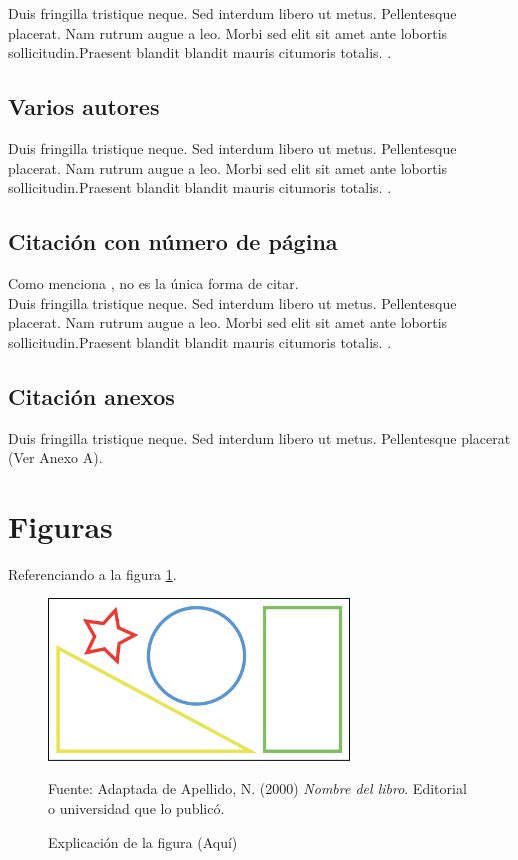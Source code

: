 Duis fringilla tristique neque. Sed interdum libero ut metus.
Pellentesque placerat. Nam rutrum augue a leo. Morbi sed 
elit sit amet ante lobortis sollicitudin.Praesent blandit 
blandit mauris citumoris totalis. \cite{libro:ejemplo}.

\subsection*{Varios autores}

Duis fringilla tristique neque. Sed interdum libero ut metus.
Pellentesque placerat. Nam rutrum augue a leo. Morbi sed 
elit sit amet ante lobortis sollicitudin.Praesent blandit 
blandit mauris citumoris totalis. \cite{libro:ejemplo_varios_autores}.

\subsection{Citación con número de página}

Como menciona , no es la única
forma de citar.\\

Duis fringilla tristique neque. Sed interdum libero ut metus.
Pellentesque placerat. Nam rutrum augue a leo. Morbi sed 
elit sit amet ante lobortis sollicitudin.Praesent blandit 
blandit mauris citumoris totalis. \cite[p.~7-12]{libro:ejemplo_varios_autores}.

\subsection{Citación anexos}
Duis fringilla tristique neque. Sed interdum libero ut metus.
Pellentesque placerat (Ver Anexo A).

\section{Figuras}
Referenciando a la figura \ref{fig:ejemplo}.

\begin{figure}[H]
    \begin{center}
        \includegraphics[width=8cm]{img/capitulo_1/figura_ejemplo.png}
    \end{center}
    \caption{Explicación de la figura (Aquí)}
    Fuente: Adaptada de Apellido, N. (2000) \textit{Nombre del libro}.
    Editorial o universidad que lo publicó.
    \label{fig:ejemplo}
\end{figure}

